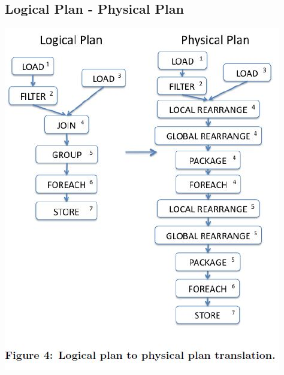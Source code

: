 \subsection{Logical Plan - Physical Plan}
\begin{frame}
\centerline{\includegraphics[scale=0.40]{Images/Logical_Physical.JPG} }
\let\thefootnote\relax{}
\end{frame}

